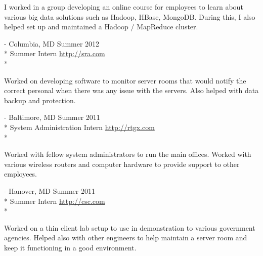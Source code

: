 \documentclass[a4paper,margin,line,11pt]{resume}
\newcommand{\rurl}[1]{\hfill {\footnotesize \url{#1}}}
\newcommand{\rdate}[1]{\hfill {\small #1}}
\renewcommand{\employer}[5]{\item[#1] - #2 \rdate{#3} \\* #4 \rurl{#5} \\*}
\begin{document}
\begin{resume}
\begin{asparadesc}
		\small
		I worked in a group developing an online course for employees to learn about various big data solutions such as Hadoop, HBase, MongoDB. During this, I also helped set up and maintained a Hadoop / MapReduce cluster. 
		\normalsize
		\\
		\employer{SRA, International}{Columbia, MD}{Summer 2012}{Summer Intern}{http://sra.com}

		\small
		Worked on developing software to monitor server rooms that would notify the correct personal when there was any issue with the servers. Also helped with data backup and protection.
		\normalsize
		\\
		\employer{RTGX - Ross Technology, Inc}{Baltimore, MD}{Summer 2011}{System Administration Intern}{http://rtgx.com}

		\small
		Worked with fellow system administrators to run the main offices. Worked with various wireless routers and computer hardware to provide support to other employees.
		\normalsize
		\\
		\employer{Computer Science Corporation}{Hanover, MD}{Summer 2011}{Summer Intern}{http://csc.com}
		
		\small
		Worked on a thin client lab setup to use in demonstration to various government agencies. Helped also with other engineers to help maintain a server room and keep it functioning in a good environment.
		\normalsize
	\end{asparadesc}


\end{resume}
\end{document}
